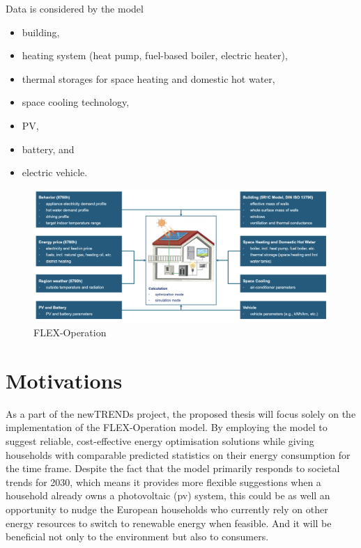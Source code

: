 Data is considered by the model

\begin{itemize}
  \item building,
  \item heating system (heat pump, fuel-based boiler, electric heater),
  \item thermal storages for space heating and domestic hot water,
  \item space cooling technology,
  \item PV,
  \item battery, and
  \item electric vehicle.
\end{itemize}

\begin{figure}[h]
  \centering
  \includegraphics[width=\textwidth]{Images/flex-operation.png}
  \caption{FLEX-Operation}
  \label{fig:flex-operation}
\end{figure}

\section{Motivations}

As a part of the newTRENDs project, 
the proposed thesis will focus solely on the implementation of the FLEX-Operation model.  
By employing the model to 
suggest reliable, cost-effective energy optimisation solutions 
while giving households with comparable predicted statistics on their energy consumption for the time frame. 
Despite the fact that the model primarily responds to societal trends for 2030, 
which means it provides more flexible suggestions when a household already owns a photovoltaic (\gls{pv}) system, 
this could be as well an opportunity to nudge the European households who currently rely on other energy resources
to switch to renewable energy when feasible. 
And it will be beneficial not only to the environment but also to consumers. 

